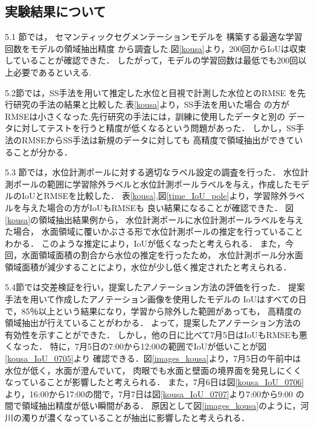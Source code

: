 \subsection{実験結果について}
5.1 節では，
セマンティックセグメンテーションモデルを
構築する最適な学習回数をモデルの領域抽出精度
から調査した.図\ref{kousa}より，200回からIoUは収束していることが確認できた．
したがって，モデルの学習回数は最低でも200回以上必要であるといえる.

5.2節では，SS手法を用いて推定した水位と目視で計測した水位とのRMSE
を先行研究の手法の結果と比較した.表\ref{kousa}より，SS手法を用いた場合 
の方がRMSEは小さくなった.先行研究の手法には，訓練に使用したデータと別の
データに対してテストを行うと精度が低くなるという問題があった．
しかし，SS手法のRMSEからSS手法は新規のデータに対しても
高精度で領域抽出ができていることが分かる．

5.3 節では，水位計測ポールに対する適切なラベル設定の調査を行った．
水位計測ポールの範囲に学習除外ラベルと水位計測ポールラベルを与え，作成したモデルのIoUとRMSEを比較した．
表\ref{kousa},図\ref{time_IoU_pole}より，学習除外ラベルを与えた場合の方がIoUもRMSEも
良い結果になることが確認できた．
図\ref{kousa}の領域抽出結果例から，
水位計測ポールに水位計測ポールラベルを与えた場合，
水面領域に覆いかぶさる形で水位計測ポールの推定を行っていることわかる．
このような推定により，IoUが低くなったと考えられる．
また，今回，水面領域面積の割合から水位の推定を行ったため，
水位計測ポール分水面領域面積が減少することにより，水位が少し低く推定されたと考えられる．

5.4節では交差検証を行い，提案したアノテーション方法の評価を行った．
提案手法を用いて作成したアノテーション画像を使用したモデルの
IoUはすべての日で，85％以上という結果になり，学習から除外した範囲があっても，
高精度の領域抽出が行えていることがわかる．
よって，提案したアノテーション方法の有効性を示すことができた．
しかし，他の日に比べて7月5日はIoUもRMSEも悪くなった．
特に，7月5日の7:00から12:00の範囲でIoUが低いことが図\ref{kousa_IoU_0705}より
確認できる．図\ref{images_kousa}より，7月5日の午前中は水位が低く，水面が澄んでいて，
肉眼でも水面と壁面の境界面を発見しにくくなっていることが影響したと考えられる．
また，7月6日は図\ref{kousa_IoU_0706}より，16:00から17:00の間で，7月7日は図\ref{kousa_IoU_0707}より7:00から9:00
の間で領域抽出精度が低い瞬間がある．
原因として図\ref{images_kousa}のように，河川の濁りが濃くなっていることが抽出に影響したと考えられる．


\clearpage
